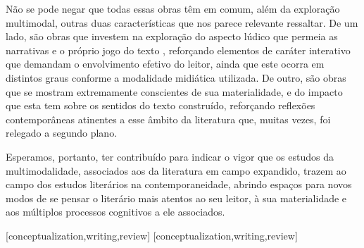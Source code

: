 \documentclass[portuguese]{textolivre}
\begin{document}
Não se pode negar que todas essas obras têm em comum, além da exploração
multimodal, outras duas características que nos parece relevante ressaltar. De
um lado, são obras que investem na exploração do aspecto lúdico que permeia as
narrativas e o próprio jogo do texto \cite{iser_o_1979}, reforçando elementos
de caráter interativo que demandam o envolvimento efetivo do leitor, ainda que
este ocorra em distintos graus conforme a modalidade midiática utilizada. De
outro, são obras que se mostram extremamente conscientes de sua materialidade,
e do impacto que esta tem sobre os sentidos do texto construído, reforçando
reflexões contemporâneas atinentes a esse âmbito da literatura que, muitas
vezes, foi relegado a segundo plano. 

Esperamos, portanto, ter contribuído para indicar o vigor que os estudos da
multimodalidade, associados aos da literatura em campo expandido, trazem ao
campo dos estudos literários na contemporaneidade, abrindo espaços para novos
modos de se pensar o literário mais atentos ao seu leitor, à sua materialidade
e aos múltiplos processos cognitivos a ele associados.



\printbibliography\label{sec-bib}
\begin{contributors}
[conceptualization,writing,review]
[conceptualization,writing,review]
\end{contributors}
\end{document}
